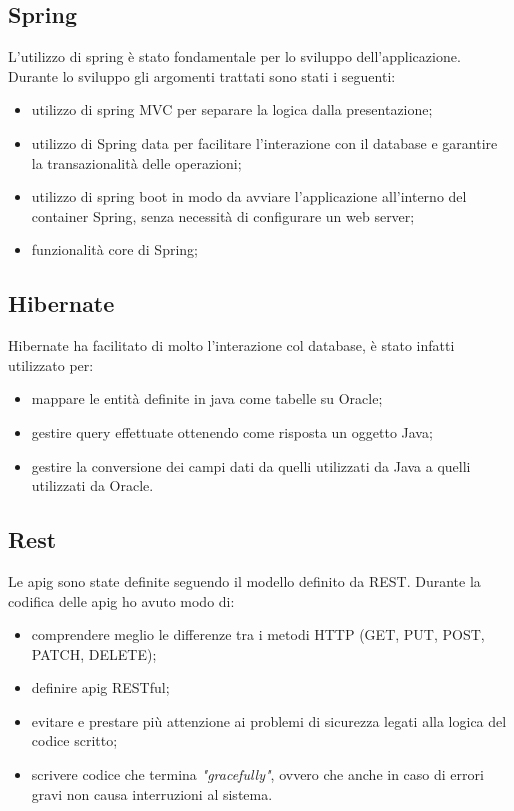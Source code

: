 \subsection{Spring}
L'utilizzo di spring è stato fondamentale per lo sviluppo dell'applicazione. Durante lo sviluppo gli argomenti trattati sono stati i seguenti:
\begin{itemize}
    \item utilizzo di spring MVC per separare la logica dalla presentazione;
    \item utilizzo di Spring data per facilitare l'interazione con il database e garantire la transazionalità delle operazioni;
    \item utilizzo di spring boot in modo da avviare l'applicazione all'interno del container Spring, senza necessità di configurare un web server;
    \item funzionalità core di Spring;
\end{itemize}

\subsection{Hibernate}
Hibernate ha facilitato di molto l'interazione col database, è stato infatti utilizzato per:
\begin{itemize}
    \item mappare le entità definite in java come tabelle su Oracle;
    \item gestire query effettuate ottenendo come risposta un oggetto Java;
    \item gestire la conversione dei campi dati da quelli utilizzati da Java a quelli utilizzati da Oracle.
\end{itemize}

\subsection{Rest}
Le \gls{apig} sono state definite seguendo il modello definito da REST.
Durante la codifica delle \gls{apig} ho avuto modo di:
\begin{itemize}
    \item comprendere meglio le differenze tra i metodi HTTP (GET, PUT, POST, PATCH, DELETE);
    \item definire \gls{apig} RESTful;
    \item evitare e prestare più attenzione ai problemi di sicurezza legati alla logica del codice scritto;
    \item scrivere codice che termina \textit{"gracefully"}, ovvero che anche in caso di errori gravi non causa interruzioni al sistema.
\end{itemize}

